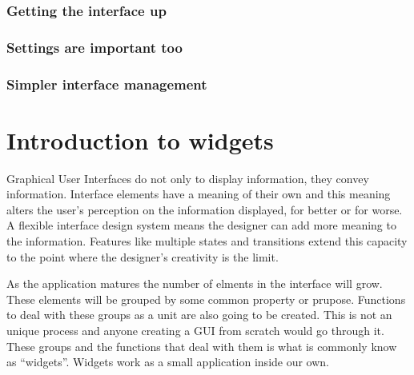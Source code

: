 \documentclass[12pt,a4paper,english]{book}
\begin{document}

\hypertarget{getting-the-interface-up}{}
\subsection{Getting the interface up}
\label{getting-the-interface-up}



\hypertarget{settings-are-important-too}{}
\subsection{Settings are important too}
\label{settings-are-important-too}



\hypertarget{simpler-interface-management}{}
\subsection{Simpler interface management}
\label{simpler-interface-management}



\hypertarget{introduction-to-widgets}{}
\chapter{Introduction to widgets}
\label{introduction-to-widgets}

Graphical User Interfaces do not only to display information, they convey
information. Interface elements have a meaning of their own and this meaning
alters the user's perception on the information displayed, for better or for
worse. A flexible interface design system means the designer can add more
meaning to the information. Features like multiple states and transitions
extend this capacity to the point where the designer's creativity is the limit.

As the application matures the number of elments in the interface will grow.
These elements will be grouped by some common property or prupose. Functions to
deal with these groups as a unit are also going to be created. This is not an
unique process and anyone creating a GUI from scratch would go through it.
These groups and the functions that deal with them is what is commonly know as
``widgets''. Widgets work as a small application inside our own.
\end{document}
